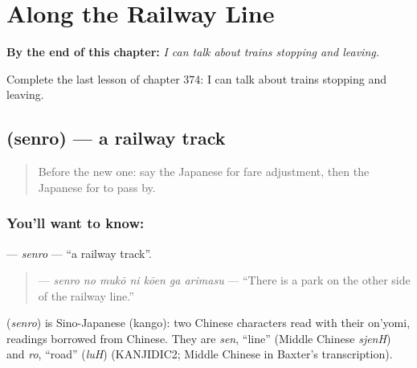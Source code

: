 
\chapter{Along the Railway Line}
\label{ch:ja-along-the-railway-line}

\begin{chapteropening}
\textbf{By the end of this chapter:} \emph{I can talk about trains stopping and leaving.}

Complete the last lesson of chapter 374: I can talk about trains stopping and leaving.
\end{chapteropening}

\section[\texorpdfstring{\ja{せんろ} (senro)}{せんろ (senro)}]{ (senro) — a railway track}

\label{lesson:JA-C374-senro}



\begin{quote}
Before the new one: say the Japanese for fare adjustment, then the Japanese for to pass by.
\end{quote}

\subsection*{You'll want to know: }
\textbf{} — \emph{senro} — \textquotedblleft{}a railway track\textquotedblright{}.

\begin{quote}
\textbf{   } — \emph{senro no mukō ni kōen ga arimasu} — \textquotedblleft{}There is a park on the other side of the railway line.\textquotedblright{}
\end{quote}

\begin{cousinweb}
\textbf{} (\emph{senro}) is Sino-Japanese (kango): two Chinese characters read with their on'yomi, readings borrowed from Chinese. They are \emph{sen}, \textquotedblleft{}line\textquotedblright{} (Middle Chinese \emph{sjenH}) and \emph{ro}, \textquotedblleft{}road\textquotedblright{} (\emph{luH}) (KANJIDIC2; Middle Chinese in Baxter's transcription).
\end{cousinweb}

